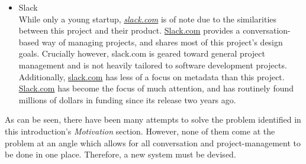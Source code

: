 \documentclass[10pt]{article}
\begin{document}
\begin{itemize}
\item Slack \\
	While only a young startup, \emph{\url{slack.com}} is of note due to the similarities between this project and their product. \url{Slack.com} provides a conversation-based way of managing projects, and shares most of this project's design goals. Crucially however, slack.com is geared toward general project management and is not heavily tailored to software development projects. Additionally, \url{slack.com} has less of a focus on metadata than this project. \url{Slack.com} has become the focus of much attention, and has routinely found millions of dollars in funding since its release two years ago. 
\end{itemize}
\par As can be seen, there have been many attempts to solve the problem identified in this introduction's \emph{Motivation} section. However, none of them come at the problem at an angle which allows for all conversation and project-management to be done in one place. Therefore, a new system must be devised. 
\end{document}
